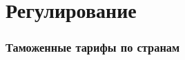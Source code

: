 \section{Регулирование}

\begin{frame}
    \frametitle{Таможенные тарифы по странам}
    \begin{center}
    
    \end{center}
\end{frame}